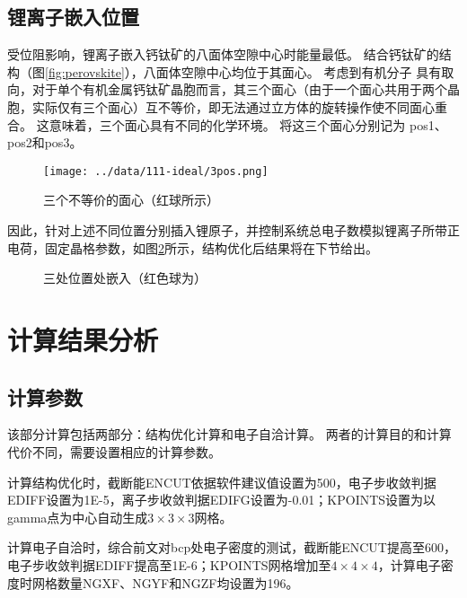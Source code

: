 \subsection{锂离子嵌入位置}

受位阻影响，锂离子嵌入钙钛矿的八面体空隙中心时能量最低。
结合钙钛矿的结构（图\ref{fig:perovskite}），八面体空隙中心均位于其面心。
考虑到有机分子  具有取向，对于单个有机金属钙钛矿晶胞而言，其三个面心（由于一个面心共用于两个晶胞，实际仅有三个面心）互不等价，即无法通过立方体的旋转操作使不同面心重合。
这意味着，三个面心具有不同的化学环境。
将这三个面心分别记为 pos1、pos2和pos3。

\begin{figure}[ht]
    \centering
    \texttt{[image: ../data/111-ideal/3pos.png]}
    \caption{三个不等价的面心（红球所示）}
    \label{fig:3pos}
\end{figure}


因此，针对上述不同位置分别插入锂原子，并控制系统总电子数模拟锂离子所带正电荷，固定晶格参数，如图\ref{fig:111-pos-poscar}所示，结构优化后结果将在下节给出。

\begin{figure}[htbp]
    \centering
    \caption{三处位置处嵌入（红色球为）}
    \label{fig:111-pos-poscar}
\end{figure}

\section{计算结果分析}

\subsection{计算参数}

该部分计算包括两部分：结构优化计算和电子自洽计算。
两者的计算目的和计算代价不同，需要设置相应的计算参数。

计算结构优化时，截断能ENCUT依据软件建议值设置为500，电子步收敛判据EDIFF设置为1E-5，离子步收敛判据EDIFG设置为-0.01；KPOINTS设置为以gamma点为中心自动生成$3\times3\times3$网格。

计算电子自洽时，综合前文对bcp处电子密度的测试，截断能ENCUT提高至600，电子步收敛判据EDIFF提高至1E-6；KPOINTS网格增加至$4\times4\times4$，计算电子密度时网格数量NGXF、NGYF和NGZF均设置为196。

